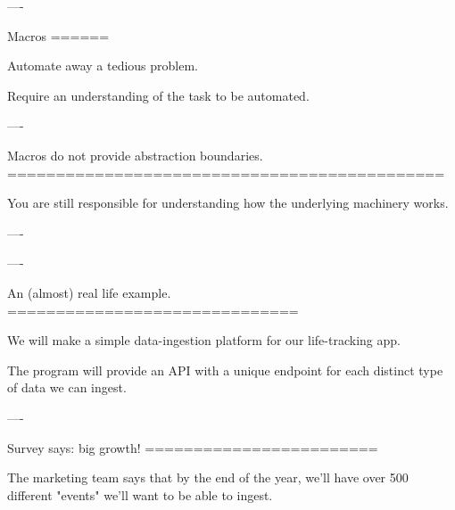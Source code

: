 ----

Macros
======

Automate away a tedious problem.

Require an understanding of the task to be automated.

----

Macros do not provide abstraction boundaries.
=============================================

You are still responsible for understanding how the underlying machinery works.

----




































































----

An (almost) real life example.
==============================

We will make a simple data-ingestion platform for our life-tracking app.

The program will provide an API with a unique endpoint for each distinct type of data we can ingest.

----

Survey says: big growth!
========================

The marketing team says that by the end of the year, we'll have over 500 different "events" we'll want to be able to
ingest.

